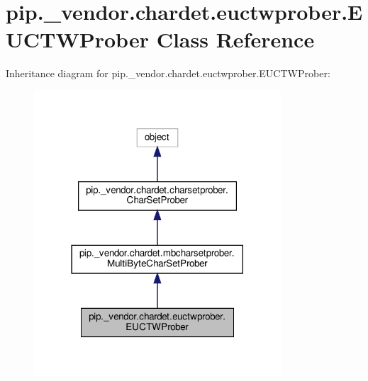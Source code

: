 \hypertarget{classpip_1_1__vendor_1_1chardet_1_1euctwprober_1_1EUCTWProber}{}\section{pip.\+\_\+vendor.\+chardet.\+euctwprober.\+E\+U\+C\+T\+W\+Prober Class Reference}
\label{classpip_1_1__vendor_1_1chardet_1_1euctwprober_1_1EUCTWProber}


Inheritance diagram for pip.\+\_\+vendor.\+chardet.\+euctwprober.\+E\+U\+C\+T\+W\+Prober\+:
\nopagebreak
\begin{figure}[H]
\begin{center}
\leavevmode
\includegraphics[width=261pt]{classpip_1_1__vendor_1_1chardet_1_1euctwprober_1_1EUCTWProber__inherit__graph}
\end{center}
\end{figure}


